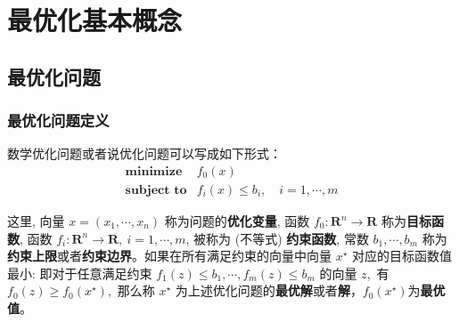 \chapter{最优化基本概念}
\vspace{-0.8cm}
\section{最优化问题}
\vspace{-0.3cm}
\subsection{最优化问题定义}
\cite{boyd2004convex}数学优化问题或者说优化问题可以写成如下形式：
\vspace{-0.4cm}
$$\begin{array}{ll}
\operatorname{\textbf{minimize}} & f_{0}(x) \\ 
\textbf{subject to}& f_{i}(x) \leqslant b_{i}, \quad i=1, \cdots, m
\end{array}$$

\vspace{-0.4cm}
这里, 向量 $x=\left(x_{1}, \cdots, x_{n}\right)$ 称为问题的\textbf{优化变量}, 函数 $f_{0}: \mathbf{R}^{n} \rightarrow \mathbf{R}$ 称为\textbf{目标函数}, 函数 $f_{i}: \mathbf{R}^{n} \rightarrow \mathbf{R},\  i=1, \cdots, m$, 被称为 (不等式) \textbf{约束函数}, 常数 $b_{1}, \cdots, b_{m}$ 称为\textbf{约束上限}或者\textbf{约束边界}。如果在所有满足约束的向量中向量 $x^{\star}$ 对应的目标函数值最小: 即对于任意满足约束 $f_{1}(z) \leqslant b_{1}, \cdots, f_{m}(z) \leqslant b_{m}$ 的向量 $z$,\  有 $f_{0}(z) \geqslant f_{0}\left(x^{\star}\right)$,\  那么称 $x^{\star}$ 为上述优化问题的\textbf{最优解}或者\textbf{解}，$f_{0}\left(x^{\star}\right)$为\textbf{最优值}。
\vspace{-0.5cm}
